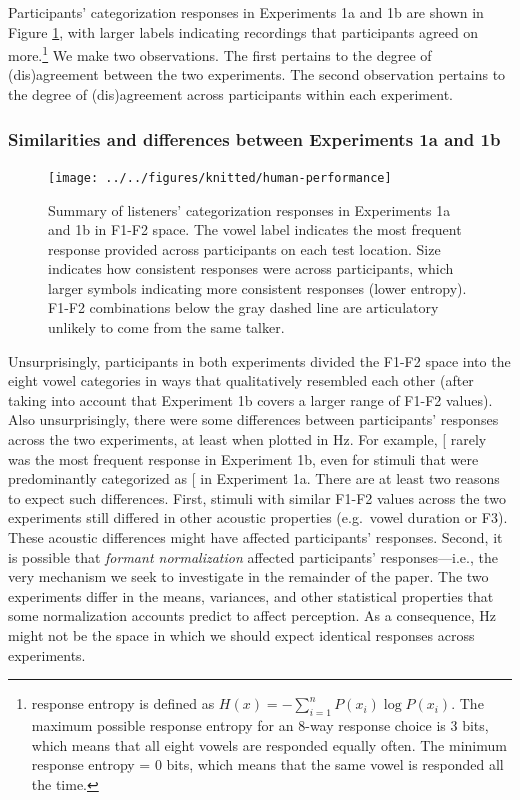 \documentclass[preprint]{JASA}
\begin{document}
Participants' categorization responses in Experiments 1a and 1b are shown in Figure \ref{fig:human-performance}, with larger labels indicating recordings that participants agreed on more.\footnote{\citet{shannon1948} response entropy is defined as \(H(x) = -\sum_{i=1}^{n} P(x_{i}) \log P(x_{i})\). The maximum possible response entropy for an 8-way response choice is 3 bits, which means that all eight vowels are responded equally often. The minimum response entropy = 0 bits, which means that the same vowel is responded all the time.} We make two observations. The first pertains to the degree of (dis)agreement between the two experiments. The second observation pertains to the degree of (dis)agreement across participants within each experiment.

\subsubsection{Similarities and differences between Experiments 1a and 1b}\label{similarities-and-differences-between-experiments-1a-and-1b}

\begin{figure}

{\centering \texttt{[image: ../../figures/knitted/human-performance]} 

}

\caption{Summary of listeners' categorization responses in Experiments 1a and 1b in F1-F2 space. The vowel label indicates the most frequent response provided across participants on each test location. Size indicates how consistent responses were across participants, which larger symbols indicating more consistent responses (lower entropy). F1-F2 combinations below the gray dashed line are articulatory unlikely to come from the same talker.}\label{fig:human-performance}
\end{figure}



Unsurprisingly, participants in both experiments divided the F1-F2 space into the eight vowel categories in ways that qualitatively resembled each other (after taking into account that Experiment 1b covers a larger range of F1-F2 values). Also unsurprisingly, there were some differences between participants' responses across the two experiments, at least when plotted in Hz. For example, {[}\ipatext{u}{]} rarely was the most frequent response in Experiment 1b, even for stimuli that were predominantly categorized as {[}\ipatext{u}{]} in Experiment 1a. There are at least two reasons to expect such differences. First, stimuli with similar F1-F2 values across the two experiments still differed in other acoustic properties (e.g.~vowel duration or F3). These acoustic differences might have affected participants' responses. Second, it is possible that \emph{formant normalization} affected participants' responses---i.e., the very mechanism we seek to investigate in the remainder of the paper. The two experiments differ in the means, variances, and other statistical properties that some normalization accounts predict to affect perception. As a consequence, Hz might not be the space in which we should expect identical responses across experiments.
\end{document}
